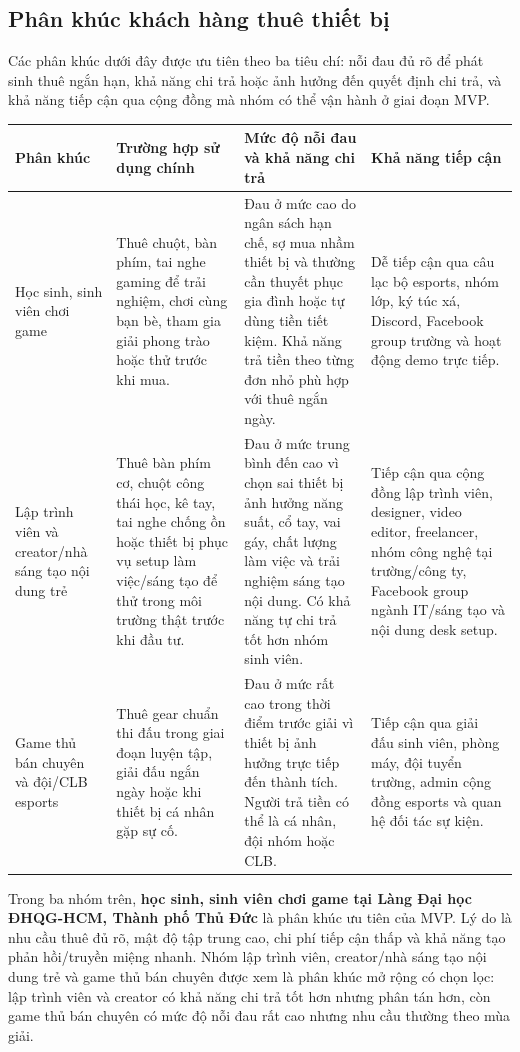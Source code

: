 \subsection{Phân khúc khách hàng thuê thiết bị}

Các phân khúc dưới đây được ưu tiên theo ba tiêu chí: nỗi đau đủ rõ để phát sinh thuê ngắn hạn, khả năng chi trả hoặc ảnh hưởng đến quyết định chi trả, và khả năng tiếp cận qua cộng đồng mà nhóm có thể vận hành ở giai đoạn MVP.


\begin{longtable}{@{}p{}p{}p{}p{}@{}}
\toprule
\textbf{Phân khúc} & \textbf{Trường hợp sử dụng chính} & \textbf{Mức độ nỗi đau và khả năng chi trả} & \textbf{Khả năng tiếp cận} \\
\midrule
\endhead
Học sinh, sinh viên chơi game & Thuê chuột, bàn phím, tai nghe gaming để trải nghiệm, chơi cùng bạn bè, tham gia giải phong trào hoặc thử trước khi mua. & Đau ở mức cao do ngân sách hạn chế, sợ mua nhầm thiết bị và thường cần thuyết phục gia đình hoặc tự dùng tiền tiết kiệm. Khả năng trả tiền theo từng đơn nhỏ phù hợp với thuê ngắn ngày. & Dễ tiếp cận qua câu lạc bộ esports, nhóm lớp, ký túc xá, Discord, Facebook group trường và hoạt động demo trực tiếp. \\
Lập trình viên và creator/nhà sáng tạo nội dung trẻ & Thuê bàn phím cơ, chuột công thái học, kê tay, tai nghe chống ồn hoặc thiết bị phục vụ setup làm việc/sáng tạo để thử trong môi trường thật trước khi đầu tư. & Đau ở mức trung bình đến cao vì chọn sai thiết bị ảnh hưởng năng suất, cổ tay, vai gáy, chất lượng làm việc và trải nghiệm sáng tạo nội dung. Có khả năng tự chi trả tốt hơn nhóm sinh viên. & Tiếp cận qua cộng đồng lập trình viên, designer, video editor, freelancer, nhóm công nghệ tại trường/công ty, Facebook group ngành IT/sáng tạo và nội dung desk setup. \\
Game thủ bán chuyên và đội/CLB esports & Thuê gear chuẩn thi đấu trong giai đoạn luyện tập, giải đấu ngắn ngày hoặc khi thiết bị cá nhân gặp sự cố. & Đau ở mức rất cao trong thời điểm trước giải vì thiết bị ảnh hưởng trực tiếp đến thành tích. Người trả tiền có thể là cá nhân, đội nhóm hoặc CLB. & Tiếp cận qua giải đấu sinh viên, phòng máy, đội tuyển trường, admin cộng đồng esports và quan hệ đối tác sự kiện. \\
\bottomrule
\end{longtable}

Trong ba nhóm trên, \textbf{học sinh, sinh viên chơi game tại Làng Đại học ĐHQG-HCM, Thành phố Thủ Đức} là phân khúc ưu tiên của MVP. Lý do là nhu cầu thuê đủ rõ, mật độ tập trung cao, chi phí tiếp cận thấp và khả năng tạo phản hồi/truyền miệng nhanh. Nhóm lập trình viên, creator/nhà sáng tạo nội dung trẻ và game thủ bán chuyên được xem là phân khúc mở rộng có chọn lọc: lập trình viên và creator có khả năng chi trả tốt hơn nhưng phân tán hơn, còn game thủ bán chuyên có mức độ nỗi đau rất cao nhưng nhu cầu thường theo mùa giải.
